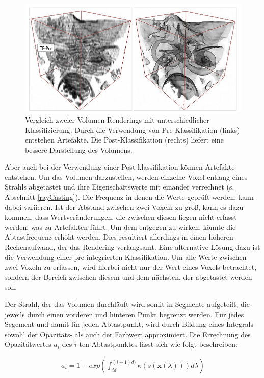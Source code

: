 \begin{figure}
	\centering
	\includegraphics[width=0.7\linewidth]{images/prepostclassification.png}
	\caption{Vergleich zweier Volumen Renderings mit unterschiedlicher Klassifizierung. Durch die Verwendung von Pre-Klassifikation (links) entstehen Artefakte. Die Post-Klassifikation (rechts) liefert eine bessere Darstellung des Volumens.}
	\label{img:repost}
\end{figure}

Aber auch bei der Verwendung einer Post-klassifikation können Artefakte entstehen.
Um das Volumen darzustellen, werden einzelne Voxel entlang eines Strahls abgetastet und ihre Eigenschaftswerte mit einander verrechnet (s. Abschnitt \ref{rayCasting}). 
Die Frequenz in denen die Werte geprüft werden, kann dabei variieren. Ist der Abstand zwischen zwei Voxeln zu groß, kann es dazu kommen, dass Wertveränderungen, die zwischen diesen liegen nicht erfasst werden, was zu Artefakten führt. 
Um dem entgegen zu wirken, könnte die Abtastfrequenz erhöht werden. Dies resultiert allerdings in einen höheren Rechenaufwand, der das Rendering verlangsamt.
Eine alternative Lösung dazu ist die Verwendung einer pre-integrierten Klassifikation.
Um alle Werte zwischen zwei Voxeln zu erfassen, wird hierbei nicht nur der Wert eines Voxels betrachtet, sondern der Bereich zwischen diesem und dem nächsten, der abgetastet werden soll. 

Der Strahl, der das Volumen durchläuft wird somit in Segmente aufgeteilt, die jeweils durch einen vorderen und hinteren Punkt begrenzt werden. Für jedes Segement und damit für jeden Abtastpunkt, wird durch Bildung eines Integrals sowohl der Opazitäts- als auch der Farbwert approximiert. 
Die Errechnung des Opazitätwertes $a_i$ des  $i$-ten Abtastpunktes lässt sich wie folgt beschreiben:

\begin{align}
   a_i = 1-exp\left ( \int_{id}^{(i+1)d)} \kappa\left ( s(\mathbf{x}(\lambda)) \right ) d\lambda  \right )
\end{align}
 
